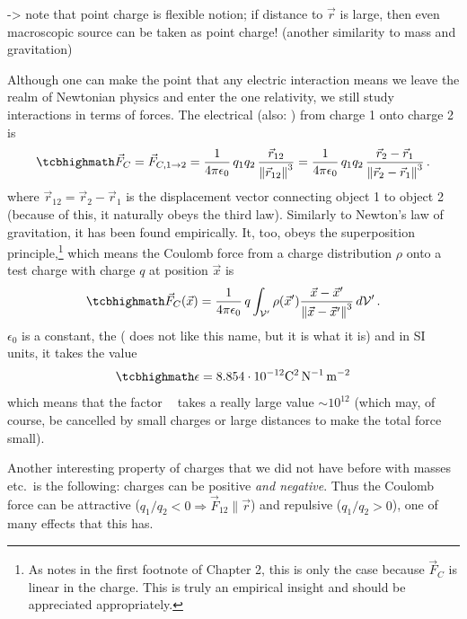 \documentclass[../class_mech_main.tex]{subfiles}
\DeclareMathOperator{\fpeps}{\frac{1}{4 \pi \epsilon_0}}
\begin{document}
-> note that point charge is flexible notion; if distance to $\vec{r}$ is large, then even macroscopic source can be taken as point charge! (another similarity to mass and gravitation)



Although one can make the point that any electric interaction means we leave the realm of Newtonian physics and enter the one relativity, we still study interactions in terms of forces. The electrical  (also: ) from charge 1 onto charge 2 is
\begin{equation}
    \eqbox{
        \vec{F}_C = \vec{F}_{C, 1 \rightarrow 2}
        = \fpeps q_1 q_2 \, \frac{\vec{r}_{12}}{\norm{\vec{r}_{12}}^3}
        = \fpeps q_1 q_2 \, \frac{\vec{r}_2 - \vec{r}_1}{\norm{\vec{r}_2 - \vec{r}_1}^3}
    } \, .
\end{equation}
where $\vec{r}_{12} = \vec{r}_2 - \vec{r}_1$ is the displacement vector connecting object 1 to object 2 (because of this, it naturally obeys the third law). Similarly to Newton's law of gravitation, it has been found empirically. It, too, obeys the superposition principle,\footnote{As \cite{Griffiths_2017} notes in the first footnote of Chapter 2, this is only the case because $\vec{F}_C$ is linear in the charge. This is truly an empirical insight and should be appreciated appropriately.} which means the Coulomb force from a charge distribution $\rho$ onto a test charge with charge $q$ at position $\vec{x}$ is
\begin{equation}
    \eqbox{
        \vec{F}_C(\vec{x}) = \fpeps q \int_{\mathcal{V}'} \rho(\vec{x}') \frac{\vec{x} - \vec{x}'}{\norm{\vec{x} - \vec{x}'}^3} \, d\mathcal{V}'
    } \, .
\end{equation}
$\epsilon_0$ is a constant, the  (\cite{Griffiths_2017} does not like this name, but it is what it is) and in SI units, it takes the value
\begin{equation}
    \eqbox{
        \epsilon = 8.854 \cdot 10^{-12} \unit{\coulomb\squared\per\newton\per\meter\squared}
    }
\end{equation}
which means that the factor $\fpeps$ takes a really large value $\sim 10^{12}$ (which may, of course, be cancelled by small charges or large distances to make the total force small).

Another interesting property of charges that we did not have before with masses etc.~is the following: charges can be positive \emph{and negative}. Thus the Coulomb force can be attractive ($q_1 / q_2 < 0 \Rightarrow \vec{F}_{12} \parallel \vec{r}$) and repulsive ($q_1 / q_2 > 0$), one of many effects that this has.
\end{document}
